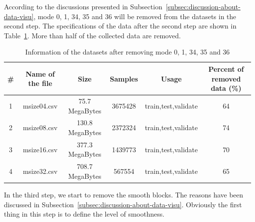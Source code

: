 According to the discussions presented in 
Subsection~\ref{subsec:discussion-about-data-visu},
mode 0, 1, 34, 35 and 36 will be removed from 
the datasets in the second step.
The specifications of the data after the second step
are shown in Table~\ref{tab:datasets-after-second-step}.
More than half of the collected data are removed.
\begin{table}[H]
    \caption{Information of the datasets after removing mode 0, 1, 34, 35 and 36}
    \bigskip\label{tab:datasets-after-second-step}
    \centering
    \begin{tabular}{c c c c c c}
        \toprule
        \# & Name of the file & Size & Samples & Usage & Percent of removed data (\%) \\
        \midrule
        1 & msize04.csv & 75.7 MegaBytes & 3675428 & train,test,validate & 64 \\
        2 & msize08.csv & 130.8 MegaBytes & 2372324 & train,test,validate & 74 \\
        3 & msize16.csv & 377.3 MegaBytes & 1439773 & train,test,validate & 70 \\
        4 & msize32.csv & 708.7 MegaBytes & 567554 & train,test,validate & 65 \\
        \bottomrule
    \end{tabular}
\end{table}
In the third step, we start to remove the smooth blocks.
The reasons have been discussed in 
Subsection~\ref{subsec:discussion-about-data-visu}.
Obviously the first thing in this step is to 
define the level of smoothness.

